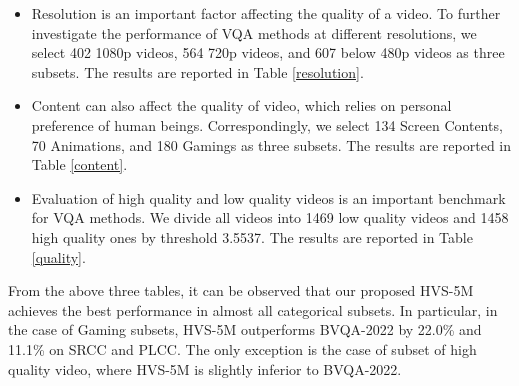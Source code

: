 \documentclass[journal]{IEEEtran}
\begin{document}
\begin{itemize}
\item Resolution is an important factor affecting the quality of a video. To further investigate the performance of VQA methods at different resolutions, we select 402 1080p videos, 564 720p videos, and 607 below 480p videos as three subsets. The results are reported in Table \ref{resolution}.

\item Content can also affect the quality of video, which relies on personal preference of human beings. Correspondingly, we select 134 Screen Contents, 70 Animations, and 180 Gamings as three subsets. The results are reported in Table \ref{content}.

\item Evaluation of high quality and low quality videos is an important benchmark for VQA methods. We divide all videos into 1469 low quality videos and 1458 high quality ones by
    threshold 3.5537. The results are reported in Table \ref{quality}.
\end{itemize}

From the above three tables, it can be observed that our proposed HVS-5M achieves the best performance in almost all categorical subsets.
In particular, in the case of Gaming subsets, HVS-5M outperforms BVQA-2022 \cite{Li2022} by 22.0\% and 11.1\% on SRCC and PLCC.
The only exception is the case of subset of high quality video, where HVS-5M is slightly inferior to BVQA-2022.
\end{document}
